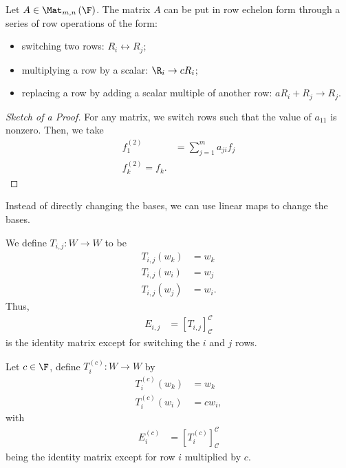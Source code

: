 \documentclass[10pt]{mypackage}
\begin{document}
\begin{theorem}
  Let $A\in \Mat_{m,n}\left(\F\right)$. The matrix $A$ can be put in row echelon form through a series of row operations of the form:
  \begin{itemize}
    \item switching two rows: $R_i\leftrightarrow R_j$;
    \item multiplying a row by a scalar: $\R_i\rightarrow cR_i$;
    \item replacing a row by adding a scalar multiple of another row: $aR_i + R_j\rightarrow R_j$.
  \end{itemize}
\end{theorem}
\begin{proof}[Sketch of a Proof]
  For any matrix, we switch rows such that the value of $a_{11}$ is nonzero. Then, we take
  \begin{align*}
    f_{1}^{(2)} &= \sum_{j=1}^{m}a_{ji}f_j\\
    f_k^{(2)} = f_{k}.
  \end{align*}
\end{proof}
Instead of directly changing the bases, we can use linear maps to change the bases.\newline

We define $T_{i,j}: W\rightarrow W$ to be
\begin{align*}
  T_{i,j}\left(w_{k}\right) &= w_k\tag*{$k\neq i,j$}\\
  T_{i,j}\left(w_i\right) &= w_j\\
  T_{i,j}\left(w_j\right) &= w_i.
\end{align*}
Thus,
\begin{align*}
  E_{i,j} &= \left[T_{i,j}\right]_{\mathcal{C}}^{\mathcal{C}}
\end{align*}
is the identity matrix except for switching the $i$ and $j$ rows.\newline

Let $c\in \F$, define $T_i^{(c)}:W\rightarrow W$ by
\begin{align*}
  T_i^{(c)}\left(w_k\right) &= w_k\tag*{$k\neq i$}\\
  T_{i}^{(c)}\left(w_i\right) &= cw_i,
\end{align*}
with
\begin{align*}
  E_i^{(c)} &= \left[T_{i}^{(c)}\right]_{\mathcal{C}}^{\mathcal{C}}
\end{align*}
being the identity matrix except for row $i$ multiplied by $c$.\newline
\end{document}

